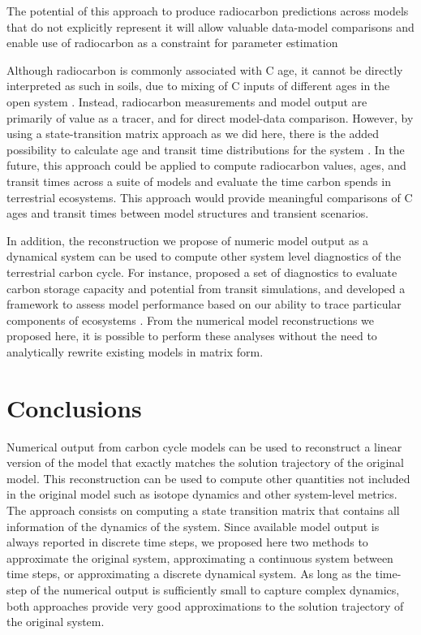 \documentclass[draft]{agujournal2019}
\begin{document}

The potential of this approach to produce radiocarbon predictions across models that do not explicitly represent it will allow valuable data-model comparisons and enable use of radiocarbon as a constraint for parameter estimation \cite{He2016}

Although radiocarbon is commonly associated with C age, it cannot be directly interpreted as such in soils, due to mixing of C inputs of different ages in the open system \cite{Trumbore2016}. Instead, radiocarbon measurements and model output are primarily of value as a tracer, and for direct model-data comparison. However, by using a state-transition matrix approach as we did here, there is the added possibility to calculate age and transit time distributions for the system \cite{Metzler2018PNAS}. In the future, this approach could be applied to compute radiocarbon values, ages, and transit times across a suite of models and evaluate the time carbon spends in terrestrial ecosystems. This approach would provide meaningful comparisons of C ages and transit times between model structures and transient scenarios. 

In addition, the reconstruction we propose of numeric model output as a dynamical system can be used to compute other system level diagnostics of the terrestrial carbon cycle. For instance,  proposed a set of diagnostics to evaluate carbon storage capacity and potential from transit simulations, and developed a framework to assess model performance based on our ability to trace particular components of ecosystems \cite{Luo2015}. From the numerical model reconstructions we proposed here, it is possible to perform these analyses without the need to analytically rewrite existing models in matrix form.

\section{Conclusions}
Numerical output from carbon cycle models can be used to reconstruct a linear version of the model that exactly matches the solution trajectory of the original model. This reconstruction can be used to compute other quantities not included in the original model such as isotope dynamics and other system-level metrics. The approach consists on computing a state transition matrix that contains all information of the dynamics of the system. Since available model output is always reported in discrete time steps, we proposed here two methods to approximate the original system, approximating a continuous system between time steps, or approximating a discrete dynamical system. As long as the time-step of the numerical output is sufficiently small to capture complex dynamics, both approaches provide very good approximations to the solution trajectory of the original system. 
\end{document}

